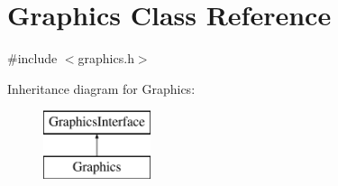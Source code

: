 \hypertarget{classGraphics}{\section{Graphics Class Reference}
\label{classGraphics}
}


{\ttfamily \#include $<$graphics.\-h$>$}

Inheritance diagram for Graphics\-:\begin{figure}[H]
\begin{center}
\leavevmode
\includegraphics[height=2.000000cm]{classGraphics}
\end{center}
\end{figure}
